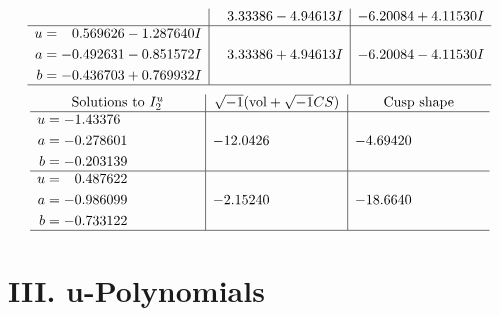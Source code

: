 \documentclass[1p]{elsarticle_modified}
\theoremstyle{definition}
\newcommand{\I}{\sqrt{-1}}
\begin{document}
$$\begin{array}{c|c|c}
 & \phantom{-}3.33386 - 4.94613 I & -6.20084 + 4.11530 I \\ \hline\begin{aligned}
u &= \phantom{-}0.569626 - 1.287640 I \\
a &= -0.492631 - 0.851572 I \\
b &= -0.436703 + 0.769932 I\end{aligned}
 & \phantom{-}3.33386 + 4.94613 I & -6.20084 - 4.11530 I\\
 \hline 
 \end{array}$$\newpage$$\begin{array}{c|c|c}  
\text{Solutions to }I^u_{2}& \I (\text{vol} + \sqrt{-1}CS) & \text{Cusp shape}\\
 \hline 
\begin{aligned}
u &= -1.43376\phantom{ +0.000000I} \\
a &= -0.278601\phantom{ +0.000000I} \\
b &= -0.203139\phantom{ +0.000000I}\end{aligned}
 & -12.0426\phantom{ +0.000000I} & -4.69420\phantom{ +0.000000I} \\ \hline\begin{aligned}
u &= \phantom{-}0.487622\phantom{ +0.000000I} \\
a &= -0.986099\phantom{ +0.000000I} \\
b &= -0.733122\phantom{ +0.000000I}\end{aligned}
 & -2.15240\phantom{ +0.000000I} & -18.6640\phantom{ +0.000000I}\\
 \hline 
 \end{array}$$\newpage
\newpage\renewcommand{\arraystretch}{1}
\centering \section*{ III. u-Polynomials}
\end{document}
